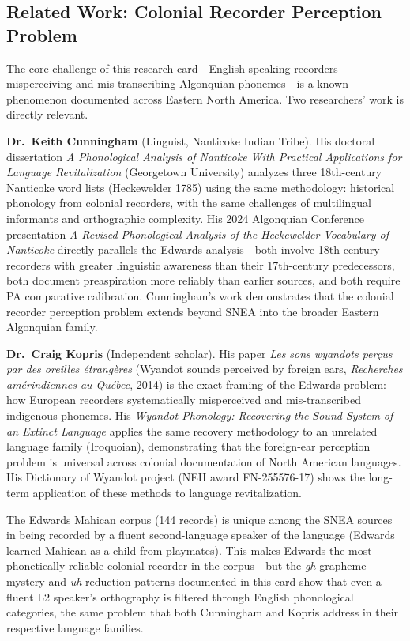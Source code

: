 \subsection{Related Work: Colonial Recorder Perception Problem}

The core challenge of this research card---English-speaking recorders
misperceiving and mis-transcribing Algonquian phonemes---is a known
phenomenon documented across Eastern North America. Two researchers' work
is directly relevant.

\textbf{Dr.\ Keith Cunningham} (Linguist, Nanticoke Indian Tribe). His
doctoral dissertation \emph{A Phonological Analysis of Nanticoke With
Practical Applications for Language Revitalization} (Georgetown University)
analyzes three 18th-century Nanticoke word lists (Heckewelder 1785) using
the same methodology: historical phonology from colonial recorders, with the
same challenges of multilingual informants and orthographic complexity. His
2024 Algonquian Conference presentation \emph{A Revised Phonological
Analysis of the Heckewelder Vocabulary of Nanticoke} directly parallels the
Edwards analysis---both involve 18th-century recorders with greater linguistic
awareness than their 17th-century predecessors, both document preaspiration
more reliably than earlier sources, and both require PA comparative
calibration. Cunningham's work demonstrates that the colonial recorder
perception problem extends beyond SNEA into the broader Eastern Algonquian
family.

\textbf{Dr.\ Craig Kopris} (Independent scholar). His paper \emph{Les sons
wyandots perçus par des oreilles étrangères} (Wyandot sounds perceived by
foreign ears, \emph{Recherches amérindiennes au Québec}, 2014) is the exact
framing of the Edwards problem: how European recorders systematically
misperceived and mis-transcribed indigenous phonemes. His \emph{Wyandot
Phonology: Recovering the Sound System of an Extinct Language} applies the
same recovery methodology to an unrelated language family (Iroquoian),
demonstrating that the foreign-ear perception problem is universal across
colonial documentation of North American languages. His Dictionary of
Wyandot project (NEH award FN-255576-17) shows the long-term application of
these methods to language revitalization.

The Edwards Mahican corpus (144 records) is unique among the SNEA sources in
being recorded by a fluent second-language speaker of the language (Edwards
learned Mahican as a child from playmates). This makes Edwards the most
phonetically reliable colonial recorder in the corpus---but the \textit{gh}
grapheme mystery and \textit{uh} reduction patterns documented in this card
show that even a fluent L2 speaker's orthography is filtered through English
phonological categories, the same problem that both Cunningham and Kopris
address in their respective language families.

